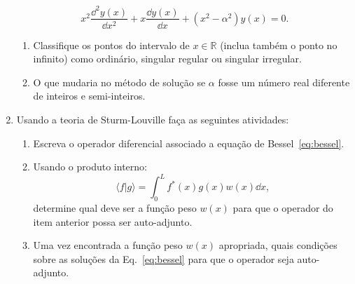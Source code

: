 \begin{enumerate}
\begin{equation}
		      x^2\frac{\dd^2 y(x)}{\dd x^2} + x\frac{\dd y(x)}{\dd x}+(x^2-\alpha^2)y(x) = 0.
	      \end{equation}
	      \begin{enumerate}
		      \item Classifique os pontos do intervalo de $x\in\mathbb{R}$ (inclua
		            também o ponto no infinito) como ordinário, singular regular ou
		            singular irregular.
		      \item O que mudaria no método de solução se $\alpha$ fosse um número real
		            diferente de inteiros e semi-inteiros.
	      \end{enumerate}
	\item Usando a teoria de Sturm-Louville faça as seguintes atividades:
	      \begin{enumerate}
		      \item Escreva o operador diferencial associado a equação de
		            Bessel~\eqref{eq:bessel}.
		      \item Usando o produto interno:
		            \begin{equation}
			            \langle f|g\rangle = \int_0^L f^*(x)g(x)w(x)\dd x,
		            \end{equation}
		            determine qual deve ser a função peso $w(x)$ para que o operador do
		            item anterior possa ser auto-adjunto.
		      \item Uma vez encontrada a função peso $w(x)$ apropriada, quais condições
		            sobre as soluções da Eq.~\eqref{eq:bessel} para que o operador seja
		            auto-adjunto.
	      \end{enumerate}
\end{enumerate}

